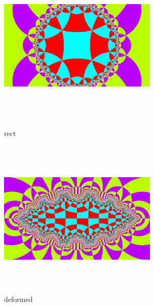 \begin{figure}[htbp]
  \begin{minipage}{0.49\hsize}
   \center
   \includegraphics[width=3in, height=3in, keepaspectratio]{../img/tessellation/hyperbolicRect}
   \caption{rect}
   \label{fig:rect}
  \end{minipage}
 \hspace*{\fill}
 \begin{minipage}{0.49\hsize}
  \center
  \includegraphics[width=3in, height=3in, keepaspectratio]{../img/tessellation/deformed.pdf}
  \caption{deformed}
  \label{fig:deformed}
 \end{minipage}
\end{figure}

\clearpage